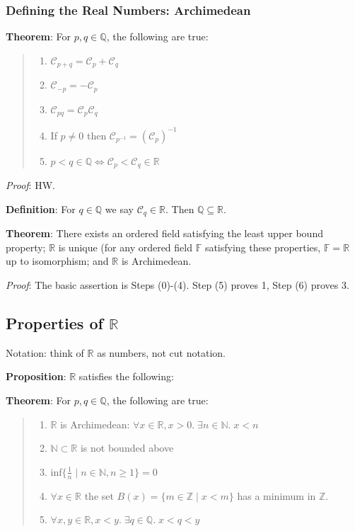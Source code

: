 \documentclass[11pt]{article}
\begin{document}
\subsubsection{Defining the Real Numbers: Archimedean}

\textbf{Theorem}: For $p,q \in \mathbb{Q}$, the following are true:
\begin{quote}\vspace{-0.3cm}
	\begin{enumerate}
	\item $\mathcal{C}_{p+q} = \mathcal{C}_p + \mathcal{C}_q$
	\item $\mathcal{C}_{-p} = -\mathcal{C}_p$
	\item $\mathcal{C}_{pq} = \mathcal{C}_p \mathcal{C}_q$
	\item If $p \neq 0$ then $\mathcal{C}_{p^{-1}} = (\mathcal{C}_p)^{-1}$
	\item $p < q \in \mathbb{Q} \iff \mathcal{C}_p < \mathcal{C}_q \in \mathbb{R}$
	\end{enumerate}
\end{quote}
\emph{Proof}: HW.

\textbf{Definition}: For $q \in \mathbb{Q}$ we say $\mathcal{C}_q \in \mathbb{R}$. Then $\mathbb{Q} \subseteq \mathbb{R}$.

\textbf{Theorem}: There exists an ordered field satisfying the least upper bound property; $\mathbb{R}$ is unique (for any ordered field $\mathbb{F}$ satisfying these properties, $\mathbb{F} = \mathbb{R}$ up to isomorphism; and $\mathbb{R}$ is Archimedean.

\emph{Proof}: The basic assertion is Steps (0)-(4). Step (5) proves 1, Step (6) proves 3.

\subsection{Properties of $\mathbb{R}$}

Notation: think of $\mathbb{R}$ as numbers, not cut notation.

\textbf{Proposition}: $\mathbb{R}$ satisfies the following:

\textbf{Theorem}: For $p,q \in \mathbb{Q}$, the following are true:
\begin{quote}\vspace{-0.3cm}
	\begin{enumerate}
	\item $\mathbb{R}$ is Archimedean: $\forall x \in \mathbb{R}, x > 0.\; \exists n \in \mathbb{N}.\; x < n$
	\item $\mathbb{N} \subset \mathbb{R}$ is not bounded above
	\item inf$\{\frac{1}{n} \;|\; n \in \mathbb{N}, n \geq 1\} = 0$
	\item $\forall x \in \mathbb{R}$ the set $B(x) = \{m \in \mathbb{Z} \;|\; x < m\}$ has a minimum in $\mathbb{Z}$.
	\item $\forall x,y \in \mathbb{R}, x < y.\; \exists q \in \mathbb{Q}.\; x < q < y$
	\end{enumerate}
\end{quote}
\end{document}
